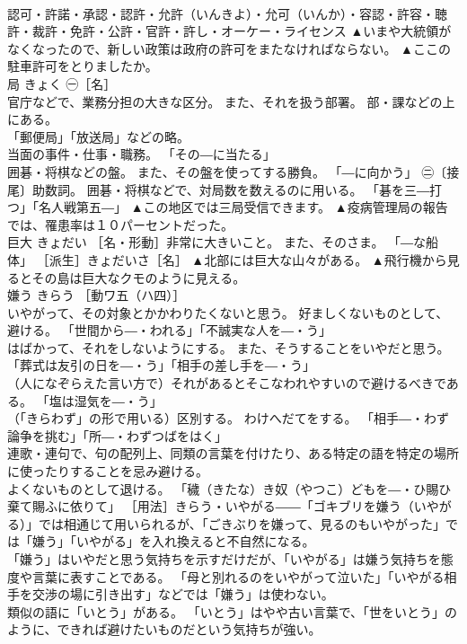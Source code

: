 \documentclass[8pt]{extreport}
\begin{document}
\begin{CJK}{UTF8}{min}
\\	認可・許諾・承認・認許・允許（いんきよ）・允可（いんか）・容認・許容・聴許・裁許・免許・公許・官許・許し・オーケー・ライセンス	▲いまや大統領がなくなったので、新しい政策は政府の許可をまたなければならない。 ▲ここの駐車許可をとりましたか。
\\	局	きょく	㊀［名］ 
\\	官庁などで、業務分担の大きな区分。 また、それを扱う部署。 部・課などの上にある。 
\\	「郵便局」「放送局」などの略。 
\\	当面の事件・仕事・職務。 「その―に当たる」 
\\	囲碁・将棋などの盤。 また、その盤を使ってする勝負。 「―に向かう」 ㊁〔接尾〕助数詞。 囲碁・将棋などで、対局数を数えるのに用いる。 「碁を三―打つ」「名人戦第五―」	▲この地区では三局受信できます。 ▲疫病管理局の報告では、罹患率は１０パーセントだった。
\\	巨大	きょだい	［名・形動］非常に大きいこと。 また、そのさま。 「―な船体」 ［派生］きょだいさ［名］	▲北部には巨大な山々がある。 ▲飛行機から見るとその島は巨大なクモのように見える。
\\	嫌う	きらう	［動ワ五（ハ四）］ 
\\	いやがって、その対象とかかわりたくないと思う。 好ましくないものとして、避ける。 「世間から―・われる」「不誠実な人を―・う」 
\\	はばかって、それをしないようにする。 また、そうすることをいやだと思う。 「葬式は友引の日を―・う」「相手の差し手を―・う」 
\\	（人になぞらえた言い方で）それがあるとそこなわれやすいので避けるべきである。 「塩は湿気を―・う」 
\\	（「きらわず」の形で用いる）区別する。 わけへだてをする。 「相手―・わず論争を挑む」「所―・わずつばをはく」 
\\	連歌・連句で、句の配列上、同類の言葉を付けたり、ある特定の語を特定の場所に使ったりすることを忌み避ける。 
\\	よくないものとして退ける。 「穢（きたな）き奴（やつこ）どもを―・ひ賜ひ棄て賜ふに依りて」 ［用法］きらう・いやがる――「ゴキブリを嫌う（いやがる）」では相通じて用いられるが、「ごきぶりを嫌って、見るのもいやがった」では「嫌う」「いやがる」を入れ換えると不自然になる。 
\\	「嫌う」はいやだと思う気持ちを示すだけだが、「いやがる」は嫌う気持ちを態度や言葉に表すことである。 「母と別れるのをいやがって泣いた」「いやがる相手を交渉の場に引き出す」などでは「嫌う」は使わない。 
\\	類似の語に「いとう」がある。 「いとう」はやや古い言葉で、「世をいとう」のように、できれば避けたいものだという気持ちが強い。 

\end{CJK}
\end{document}
